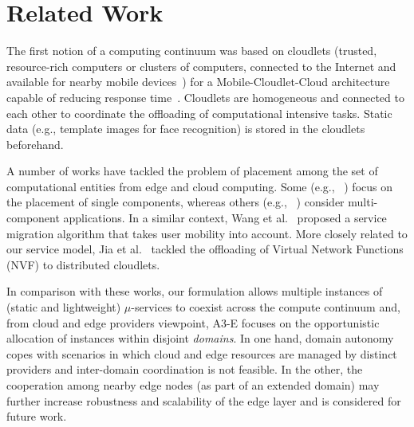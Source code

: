 \section{Related Work}
\label{sec:related}

The first notion of a computing continuum was based on cloudlets (trusted, resource-rich computers or clusters of computers, connected to the Internet and available for nearby mobile devices~\cite{Satyanarayanan09cloudlets}) for a Mobile-Cloudlet-Cloud architecture capable of reducing response time~\cite{Soyata:2012}. Cloudlets are homogeneous and connected to each other to coordinate the offloading of computational intensive tasks. Static data (e.g., template images for face recognition) is stored in the cloudlets beforehand. 


A number of works have tackled the problem of placement among the set of computational entities from edge and cloud computing. Some (e.g., ~\cite{Tarneberg2017}) focus on the placement of single components, whereas others (e.g., ~\cite{Wang:2017}) consider multi-component applications. In a similar context, Wang et al.~\cite{Wang:2015} proposed a service migration algorithm that takes user mobility into account. More closely related to our service model, Jia et al.~\cite{Jia:2017} tackled the offloading of Virtual Network Functions (NVF) to distributed cloudlets. 



In comparison with these works, our formulation allows multiple instances of (static and lightweight) $\mu$-services to coexist across the compute continuum and, from cloud and edge providers viewpoint, A3-E focuses on the opportunistic allocation of instances within disjoint \textit{domains}. In one hand, domain autonomy copes with scenarios in which cloud and edge resources are managed by distinct providers and inter-domain coordination is not feasible. In the other, the cooperation among nearby edge nodes (as part of an extended domain) may further increase robustness and scalability of the edge layer and is considered for future work.

